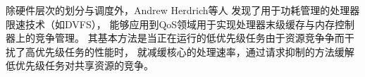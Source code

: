 

除硬件层次的划分与调度外，Andrew Herdrich等人\cite{herdrich_rate-based_2009}
发现了用于功耗管理的处理器限速技术（如DVFS），
能够应用到QoS领域用于实现处理器末级缓存与内存控制器上的竞争管理。
其基本方法是当正在运行的低优先级任务由于资源竞争争而干扰了高优先级任务的性能时，
就减缓核心的处理速率，通过请求抑制的方法缓解低优先级任务对共享资源的竞争。


\fi
